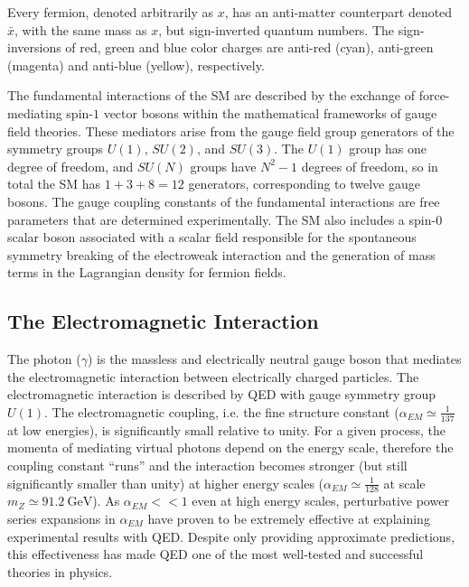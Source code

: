 \begin{refsection}
Every fermion, denoted arbitrarily as $x$, has an anti-matter counterpart denoted $\bar{x}$, with the same mass as $x$, but sign-inverted quantum numbers.
The sign-inversions of red, green and blue color charges are anti-red (cyan), anti-green (magenta) and anti-blue (yellow), respectively.

The fundamental interactions of the SM are described by the exchange of force-mediating spin-$1$ vector bosons within the mathematical frameworks of gauge field theories.
These mediators arise from the gauge field group generators of the symmetry groups $U(1)$, $SU(2)$, and $SU(3)$.
The $U(1)$ group has one degree of freedom, and $SU(N)$ groups have $N^2 - 1$ degrees of freedom, so in total the SM has $1 + 3 + 8 = 12$ generators, corresponding to twelve gauge bosons.
The gauge coupling constants of the fundamental interactions are free parameters that are determined experimentally.
The SM also includes a spin-$0$ scalar boson associated with a scalar field responsible for the spontaneous symmetry breaking of the electroweak interaction and the generation of mass terms in the Lagrangian density for fermion fields.

\subsection{The Electromagnetic Interaction}
The photon ($\gamma$) is the massless and electrically neutral gauge boson that mediates the electromagnetic interaction between electrically charged particles.
The electromagnetic interaction is described by QED with gauge symmetry group $U(1)$.
The electromagnetic coupling, i.e. the fine structure constant ($\alpha_{EM} \simeq \frac{1}{137}$ at low energies), is significantly small relative to unity.
For a given process, the momenta of mediating virtual photons depend on the energy scale, therefore the coupling constant ``runs'' and the interaction becomes stronger (but still significantly smaller than unity) at higher energy scales ($\alpha_{EM} \simeq \frac{1}{128}$ at scale $m_Z \simeq \SI{91.2}{\GeV}$).
As $\alpha_{EM} << 1$ even at high energy scales, perturbative power series expansions in $\alpha_{EM}$ have proven to be extremely effective at explaining experimental results with QED.
Despite only providing approximate predictions, this effectiveness has made QED one of the most well-tested and successful theories in physics.


\end{refsection}
